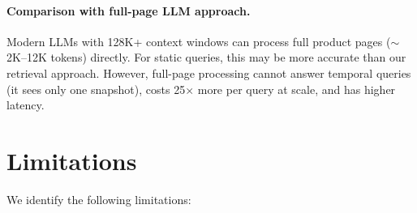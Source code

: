 \documentclass[11pt]{article}
\begin{document}
\paragraph{Comparison with full-page LLM approach.} Modern LLMs with 128K+ context windows can process full product pages ($\sim$2K--12K tokens) directly. For static queries, this may be more accurate than our retrieval approach. However, full-page processing cannot answer temporal queries (it sees only one snapshot), costs 25$\times$ more per query at scale, and has higher latency.

\section{Limitations}
\label{sec:limitations}

We identify the following limitations:
\end{document}
